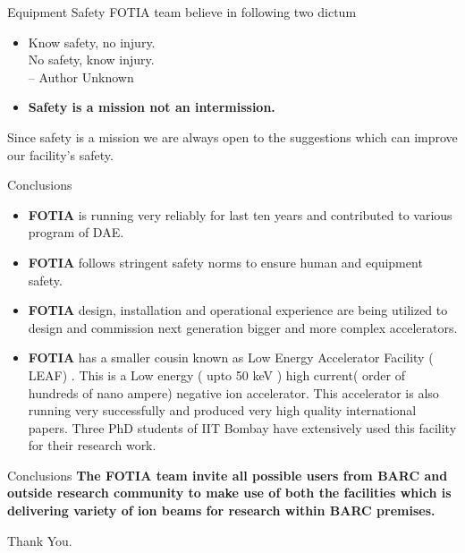 \documentclass[11pt]{beamer}
\begin{document}
\begin{frame}{Equipment Safety}
FOTIA team believe in following two dictum
\begin{itemize}
\item Know safety, no injury.\\
     No safety, know injury. \\
      -- Author Unknown			
\item \textbf{Safety is a mission not an intermission.} 
\end{itemize} 
Since safety is a mission we are always open to the suggestions which can improve our facility's safety.
\end{frame}



\begin{frame}{Conclusions}
\begin{itemize}

\item \textbf{FOTIA} is running very reliably for last ten years and contributed to various program of DAE.

\item \textbf{FOTIA} follows stringent safety norms to ensure human and equipment safety.

\item \textbf{FOTIA} design, installation and operational experience are being utilized to design and commission next generation bigger and more complex accelerators.

\item \textbf{FOTIA} has a smaller cousin known as Low Energy Accelerator Facility ( LEAF) . This is a Low energy ( upto 50 keV ) high current( order of hundreds of nano ampere) negative ion accelerator. This accelerator is also running very successfully and produced very high quality international papers. Three PhD students of IIT Bombay have extensively used this facility for their research work.



\end{itemize}
\end{frame}

\begin{frame}{Conclusions}
 \textbf{The FOTIA team invite all possible users from BARC and outside research community to make use of both the facilities which is delivering variety of ion beams for research within BARC premises.}\\
 
 \begin{center}
  \huge {Thank You.}
\end{center}
\end{frame}
\end{document}
